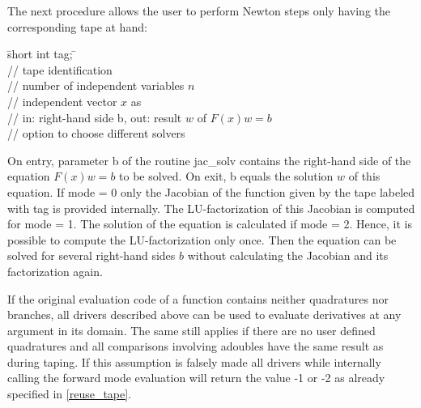 \documentclass[11pt,twoside]{article}
\begin{document}
%
The next procedure allows the user to perform Newton steps only 
having the corresponding tape at hand: 
%
\begin{tabbing}
\hspace{0.5in}\={\sf short int tag;} \hspace{1.1in}\= \kill    %
 \\
         \> // tape identification \\
                 \> // number of independent variables $n$\\
           \> // independent vector $x$ as\\
           \> // in: right-hand side b, out: result $w$ of
$F(x)w = b$\\
              \> // option to choose different solvers
\end{tabbing}
%
On entry, parameter {\sf b} of the routine {\sf jac\_solv}
contains the right-hand side of the equation $F(x)w = b$ to be solved. On exit, 
{\sf b} equals the solution $w$ of this equation. If {\sf mode} = 0 only 
the Jacobian of the function
given by the tape labeled with {\sf tag} is provided internally.
The LU-factorization of this Jacobian is computed for {\sf mode} = 1. The 
solution of the equation is calculated if {\sf mode} = 2.
Hence, it is possible to compute the 
LU-factorization only once. Then the equation can be solved for several
right-hand sides $b$ without calculating the Jacobian and
its factorization again.  

If the original evaluation code of a function contains neither
quadratures nor branches, all drivers described above can be used to
evaluate derivatives at any argument in its domain. The same still 
applies if there are no user defined quadratures and
all comparisons  involving {\sf adouble}s have the same result as
during taping. If this assumption is falsely made all drivers
while internally calling the forward mode evaluation will return the value -1 or -2 
as already specified in \autoref{reuse_tape}.  
%
\end{document}
